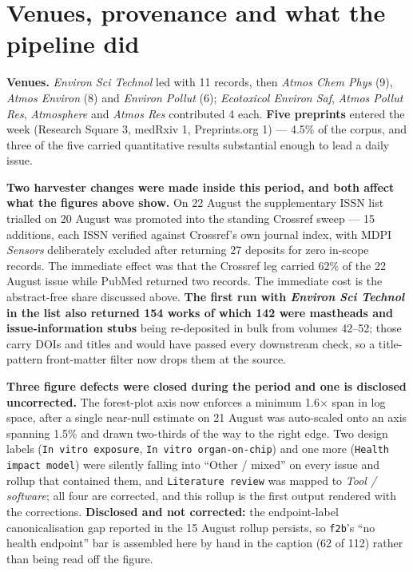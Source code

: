 \documentclass[10pt]{article}
\begin{document}
\section*{\sffamily\bfseries\color{Deep}Venues, provenance and what the pipeline did}
\vspace{-1.5mm}{\color{Teal}\rule{\linewidth}{1.1pt}}\vspace{2.5mm}

\footnotesize
\textbf{Venues.} \textit{Environ Sci Technol} led with 11 records, then
\textit{Atmos Chem Phys} (9), \textit{Atmos Environ} (8) and \textit{Environ Pollut} (6);
\textit{Ecotoxicol Environ Saf}, \textit{Atmos Pollut Res}, \textit{Atmosphere} and
\textit{Atmos Res} contributed 4 each. \textbf{Five preprints} entered the week
(Research Square 3, medRxiv 1, Preprints.org 1) --- 4.5\% of the corpus, and three of the
five carried quantitative results substantial enough to lead a daily issue.

\vspace{1.2mm}
\textbf{Two harvester changes were made inside this period, and both affect what the
figures above show.} On 22 August the supplementary ISSN list trialled on 20 August was
promoted into the standing Crossref sweep --- 15 additions, each ISSN verified against
Crossref's own journal index, with MDPI \textit{Sensors} deliberately excluded after
returning 27 deposits for zero in-scope records. The immediate effect was that the
Crossref leg carried 62\% of the 22 August issue while PubMed returned two records. The
immediate cost is the abstract-free share discussed above. \textbf{The first run with
\textit{Environ Sci Technol} in the list also returned 154 works of which 142 were
mastheads and issue-information stubs} being re-deposited in bulk from volumes 42--52;
those carry DOIs and titles and would have passed every downstream check, so a
title-pattern front-matter filter now drops them at the source.

\vspace{1.2mm}
\textbf{Three figure defects were closed during the period and one is disclosed
uncorrected.} The forest-plot axis now enforces a minimum 1.6$\times$ span in log space,
after a single near-null estimate on 21 August was auto-scaled onto an axis spanning 1.5\%
and drawn two-thirds of the way to the right edge. Two design labels
(\texttt{In vitro exposure}, \texttt{In vitro organ-on-chip}) and one more
(\texttt{Health impact model}) were silently falling into ``Other / mixed'' on every issue
and rollup that contained them, and \texttt{Literature review} was mapped to
\textit{Tool / software}; all four are corrected, and this rollup is the first output
rendered with the corrections. \textbf{Disclosed and not corrected:} the endpoint-label
canonicalisation gap reported in the 15 August rollup persists, so \texttt{f2b}'s
``no health endpoint'' bar is assembled here by hand in the caption (62 of 112) rather
than being read off the figure.
\end{document}
